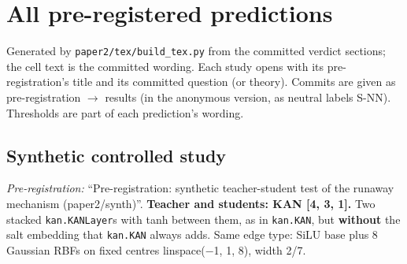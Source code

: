 \section{All pre-registered predictions}\label{app:prereg}

Generated by \texttt{paper2/tex/build\_tex.py} from the committed verdict sections; the cell text is the committed wording. Each study opens with its pre-registration's title and its committed question (or theory). Commits are given as pre-registration $\to$ results (in the anonymous version, as neutral labels S-NN). Thresholds are part of each prediction's wording.

\subsection{Synthetic controlled study}
\noindent\textit{Pre-registration:} ``Pre-registration: synthetic teacher-student test of the runaway mechanism (paper2/synth)''. \textbf{Teacher and students: KAN [4, 3, 1].} Two stacked \texttt{kan.KANLayer}s with tanh between them, as in \texttt{kan.KAN}, but \textbf{without} the salt embedding that \texttt{kan.KAN} always adds. Same edge type: SiLU base plus 8 Gaussian RBFs on fixed centres linspace($-$1, 1, 8), width 2/7.

